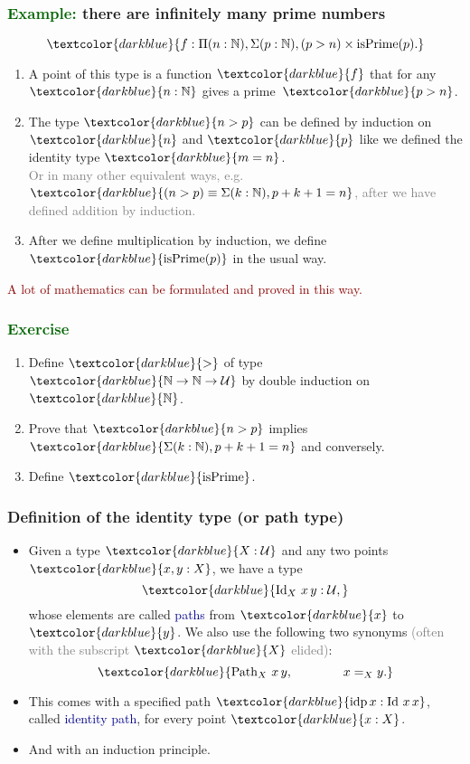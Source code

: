 \documentclass[aspectratio=169]{beamer}
\newcommand{\isPrime}{\operatorname{isPrime}}
\newcommand{\eqq}{\equiv}
\newcommand{\U}{\operatorname{\mathcal{U}}}
\newcommand{\db}{\textcolor{darkblue}}
\newcommand{\dg}{\textcolor{darkgreen}}
\newcommand{\grey}{\textcolor{grey}}
\newcommand{\dr}{\textcolor{darkred}}
\newcommand{\m}[1]{$\db{#1}$}
\newcommand{\M}[1]{\[\db{#1}\]}
\newcommand{\N}{\mathbb{N}}
\newcommand{\idp}{\operatorname{idp}}
\newcommand{\Id}{\operatorname{Id}}
\newcommand{\Path}{\operatorname{Path}}
\begin{document}
\begin{frame}
  \frametitle{\dg{Example:} there are infinitely many prime numbers}

\M{f : \Pi(n:\N), \Sigma(p:\N), (p > n) \times \isPrime(p).}


\begin{enumerate}
\vfill \item
A point of this type is a function \m{f} that for any \m{n:\N} gives a prime~\m{p > n}. 

\vfill \item The type \m{n > p} can be defined by induction on \m{n} and \m{p} like we defined the identity type \m{m = n}. \\[1ex]

\grey{Or in many other equivalent ways, e.g. \m{(n > p) \eqq \Sigma(k : \N), p + k + 1 = n}, after we have defined addition by induction.}

\vfill \item After we define multiplication by induction, we define \m{\operatorname{isPrime}(p)} in the usual way.

\end{enumerate}
\vfill
\dr{A lot of mathematics can be formulated and proved in this way.}

\end{frame}

\begin{frame}
  \frametitle{\dg{Exercise}}

  \begin{enumerate}
  \item Define \m{>} of type \m{\N \to \N \to \U} by double induction on \m{\N}.
  \item Prove that \m{n > p} implies \m{\Sigma(k : \N), p + k + 1 = n} and conversely.
  \item Define \m{\operatorname{isPrime}}.
  \end{enumerate}
  
\end{frame}

\begin{frame}
  \frametitle{Definition of the identity type (or path type)}

  \begin{itemize}
    \vfill \item 
    Given a type \m{X : \U} and any two points \m{x,y:X}, we have a type \M{\Id_X \, x \, y : \U,} whose
    elements are called \db{paths} from \m{x} to \m{y}.
    \vfill
    We also use the following two synonyms \grey{(often with the subscript \m{X} elided)}:
    \M{\Path_X \,x \,y, \qquad \qquad x =_X y.}
    \vfill \item
    This comes with a specified path \m{\idp x : \Id \, x \, x}, called \db{identity path}, for every point \m{x:X}.
    \vfill \item
    And with an induction principle.
  \end{itemize}

\end{frame}
\end{document}
